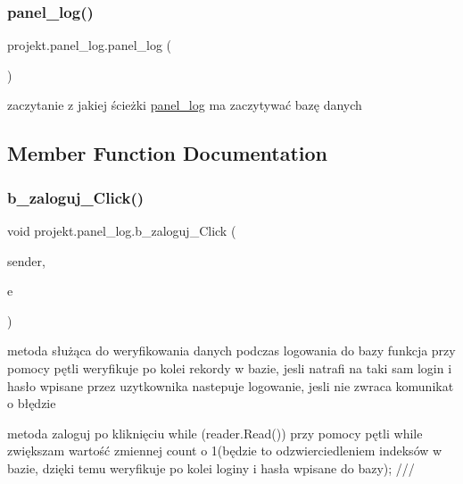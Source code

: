 \subsubsection{\texorpdfstring{panel\+\_\+log()}{panel\_log()}}
{\footnotesize\ttfamily projekt.\+panel\+\_\+log.\+panel\+\_\+log (\begin{DoxyParamCaption}{ }\end{DoxyParamCaption})\hspace{0.3cm}{\ttfamily [inline]}}



zaczytanie z jakiej ścieżki \mbox{\hyperlink{classprojekt_1_1panel__log}{panel\+\_\+log}} ma zaczytywać bazę danych 



\subsection{Member Function Documentation}
\mbox{\label{classprojekt_1_1panel__log_ac071ade9d2f740ce0513d72399bf6847}} 
\subsubsection{\texorpdfstring{b\+\_\+zaloguj\+\_\+\+Click()}{b\_zaloguj\_Click()}}
{\footnotesize\ttfamily void projekt.\+panel\+\_\+log.\+b\+\_\+zaloguj\+\_\+\+Click (\begin{DoxyParamCaption}\item[{object}]{sender,  }\item[{Routed\+Event\+Args}]{e }\end{DoxyParamCaption})\hspace{0.3cm}{\ttfamily [inline]}}



metoda służąca do weryfikowania danych podczas logowania do bazy funkcja przy pomocy pętli weryfikuje po kolei rekordy w bazie, jesli natrafi na taki sam login i hasło wpisane przez uzytkownika nastepuje logowanie, jesli nie zwraca komunikat o błędzie 

metoda zaloguj po kliknięciu while (reader.\+Read()) przy pomocy pętli while zwiększam wartość zmiennej count o 1(będzie to odzwierciedleniem indeksów w bazie, dzięki temu weryfikuje po kolei loginy i hasła wpisane do bazy); ///

